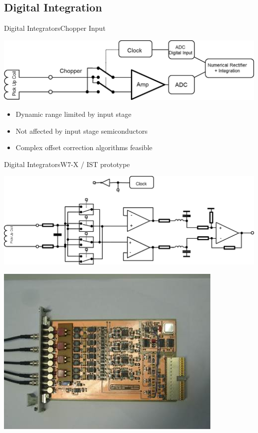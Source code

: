 \documentclass{beamer}
\begin{document}
\subsection{Digital Integration}
\begin{frame}{Digital Integrators}{Chopper Input}
	\begin{center}
		\includegraphics[width=0.8\columnwidth]{chopperInt.png}
	\end{center}
	\begin{itemize}
		\item Dynamic range limited by input stage
		\item Not affected by input stage semiconductors
		\item Complex offset correction algorithms feasible
 	\end{itemize}
%
%
\end{frame}

\begin{frame}{Digital Integrators}{W7-X / IST prototype}
	\begin{center}
		\includegraphics[width=0.7\columnwidth]{w7xSchema.png}
		
		\includegraphics[height = 3 cm]{w7xInt.jpg}
	\end{center}
\end{frame}
\end{document}
